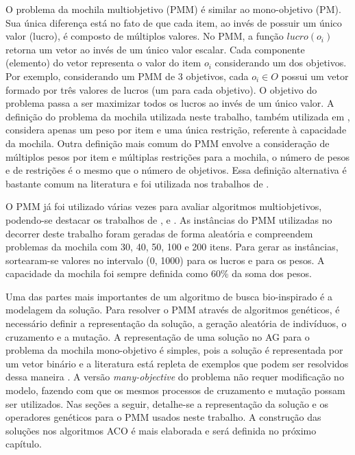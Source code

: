 O problema da mochila multiobjetivo (PMM) é similar ao mono-objetivo (PM). Sua única diferença está no fato de que cada item, ao invés de possuir um único valor (lucro), é composto de múltiplos valores. No PMM, a função $lucro(o_i)$ retorna um vetor ao invés de um único valor escalar. Cada componente (elemento) do vetor representa o valor do item $o_i$ considerando um dos objetivos. Por exemplo, considerando um PMM de 3 objetivos, cada $o_i \in O$ possui um vetor formado por três valores de lucros (um para cada objetivo). O objetivo do problema passa a ser maximizar todos os lucros ao invés de um único valor. A definição do problema da mochila utilizada neste trabalho, também utilizada em \cite{MKP}, considera apenas um peso por item e uma única restrição, referente à capacidade da mochila. Outra definição mais comum do PMM envolve a consideração de múltiplos pesos por item e múltiplas restrições para a mochila, o número de pesos e de restrições é o mesmo que o número de objetivos. Essa definição alternativa é bastante comum na literatura e foi utilizada nos trabalhos de \cite{Alaya2004,Chu1998,Ishibuchi2015}. 

O PMM já foi utilizado várias vezes para avaliar algoritmos multiobjetivos, podendo-se destacar os trabalhos de \cite{Zitzler1999}, \cite{Zitzler2002} e \cite{Zhang2007}. As instâncias do PMM utilizadas no decorrer deste trabalho foram geradas de forma aleatória e compreendem problemas da mochila com 30, 40, 50, 100 e 200 itens. Para gerar as instâncias, sortearam-se valores no intervalo (0, 1000) para os lucros e para os pesos. A capacidade da mochila foi sempre definida como 60\% da soma dos pesos.

Uma das partes mais importantes de um algoritmo de busca bio-inspirado é a modelagem da solução. Para resolver o PMM através de algoritmos genéticos, é necessário definir a representação da solução, a geração aleatória de indivíduos, o cruzamento e a mutação. A representação de uma solução no AG para o problema da mochila mono-objetivo é simples, pois a solução é representada por um vetor binário e a literatura está repleta de exemplos que podem ser resolvidos dessa maneira \cite{KnapsackGA,Hristakeva2013}. A versão \textit{many-objective} do problema não requer modificação no modelo, fazendo com que os mesmos processos de cruzamento e mutação possam ser utilizados. Nas seções a seguir, detalhe-se a representação da solução e os operadores genéticos para o PMM usados neste trabalho. A construção das soluções nos algoritmos ACO é mais elaborada e será definida no próximo capítulo.

